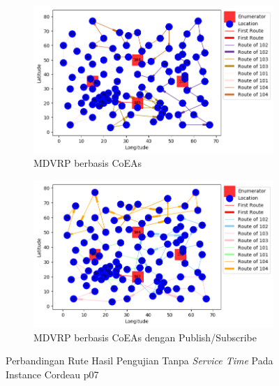 \begin{figure}[H]
	\centering
	\begin{subfigure}[t]{\textwidth}
		\centering
		\includegraphics[width=\textwidth]{Resources/Images/cordeau_p07/cordeau_p07_notw_coes}
		\caption{MDVRP berbasis CoEAs}
		\label{fig:cordeau_p07_notw_coes}
	\end{subfigure}
	\begin{subfigure}[t]{\textwidth}
		\centering
		\includegraphics[width=\textwidth]{Resources/Images/cordeau_p07/cordeau_p07_notw_pubsub_coes}
		\caption{MDVRP berbasis CoEAs dengan Publish/Subscribe}
		\label{fig:cordeau_p07_notw_pubsub_coes}
	\end{subfigure}
	\caption{Perbandingan Rute Hasil Pengujian Tanpa \textit{Service Time} Pada Instance Cordeau p07}
	\label{fig:cordeau_p07_notw}
\end{figure}


